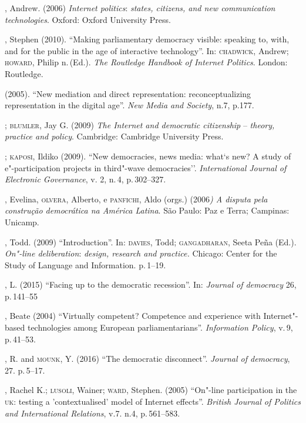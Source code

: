 \begin{bibliohedra}
, Andrew. (2006) \emph{Internet politics}: \emph{states,
citizens, and new communication technologies}. Oxford: Oxford University
Press.

, Stephen (2010). ``Making parliamentary democracy visible:
speaking to, with, and for the public in the age of interactive
technology''. In: \textsc{chadwick}, Andrew; \textsc{howard}, Philip n.\,(Ed.). \emph{The
Routledge Handbook of Internet Politics}. London: Routledge.

\titidem\mbox{} (2005). ``New mediation and direct representation:
reconceptualizing representation in the digital age''. \emph{New Media
and Society}, n.7, p.177.

\titidem; \textsc{blumler}, Jay G. (2009) \emph{The Internet and
democratic citizenship} -- \emph{theory, practice and policy}.
Cambridge: Cambridge University Press.

\titidem; \textsc{kaposi}, Ildiko (2009). ``New democracies, news media:
what`s new? A study of e"-participation projects in third"-wave
democracies''. \emph{International Journal of Electronic Governance}, v.
2, n.\,4, p.\,302--327.

, Evelina, \textsc{olvera}, Alberto, e \textsc{panfichi}, Aldo (orgs.) (2006\emph{)
A disputa pela construção democrática na América Latina}. São Paulo: Paz
e Terra; Campinas: Unicamp.

, Todd. (2009) ``Introduction''. In: \textsc{davies}, Todd; \textsc{gangadharan},
Seeta Peña (Ed.). \emph{On"-line deliberation}: \emph{design, research
and practice.} Chicago: Center for the Study of Language and
Information. p.\,1--19.

, L. (2015) ``Facing up to the democratic recession''. In:
\emph{Journal of democracy} 26, p.\,141--55

, Beate (2004) ``Virtually competent? Competence and experience
with Internet"-based technologies among European parliamentarians''.
\emph{Information Policy}, v.\,9, p.\,41--53.

, R. and \textsc{mounk}, Y. (2016) ``The democratic disconnect''.
\emph{Journal of democracy}, 27. p.\,5--17.

, Rachel K.; \textsc{lusoli}, Wainer; \textsc{ward}, Stephen. (2005) ``On"-line
participation in the \textsc{uk}: testing a 'contextualised' model of Internet
effects''. \emph{British Journal of Politics and International
Relations}, v.7. n.4, p.\,561--583.


\end{bibliohedra}
